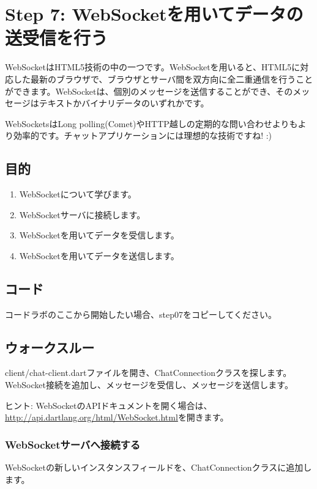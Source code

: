 \section{Step 7: WebSocketを用いてデータの送受信を行う}

WebSocketはHTML5技術の中の一つです。WebSocketを用いると、HTML5に対応した最新のブラウザで、ブラウザとサーバ間を双方向に全二重通信を行うことができます。WebSocketは、個別のメッセージを送信することができ、そのメッセージはテキストかバイナリデータのいずれかです。

WebSocketsはLong polling(Comet)やHTTP越しの定期的な問い合わせよりもより効率的です。チャットアプリケーションには理想的な技術ですね! :)

\subsection{目的}

\begin{enumerate}
\item WebSocketについて学びます。
\item WebSocketサーバに接続します。
\item WebSocketを用いてデータを受信します。
\item WebSocketを用いてデータを送信します。
\end{enumerate}

\subsection{コード}

コードラボのここから開始したい場合、step07をコピーしてください。

\subsection{ウォークスルー}

client/chat-client.dartファイルを開き、ChatConnectionクラスを探します。WebSocket接続を追加し、メッセージを受信し、メッセージを送信します。

ヒント: WebSocketのAPIドキュメントを開く場合は、\url{http://api.dartlang.org/html/WebSocket.html}を開きます。

\subsubsection{WebSocketサーバへ接続する}

WebSocketの新しいインスタンスフィールドを、ChatConnectionクラスに追加します。

